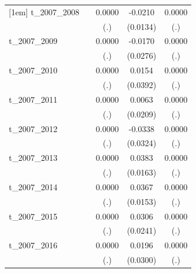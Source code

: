 \begin{table}[htbp]
\begin{tabular}{l*{4}{c}}
[1em]
t\_2007\_2008 &                     &      0.0000         &     -0.0210         &      0.0000         \\
            &                     &         (.)         &    (0.0134)         &         (.)         \\
[1em]
t\_2007\_2009 &                     &      0.0000         &     -0.0170         &      0.0000         \\
            &                     &         (.)         &    (0.0276)         &         (.)         \\
[1em]
t\_2007\_2010 &                     &      0.0000         &      0.0154         &      0.0000         \\
            &                     &         (.)         &    (0.0392)         &         (.)         \\
[1em]
t\_2007\_2011 &                     &      0.0000         &      0.0063         &      0.0000         \\
            &                     &         (.)         &    (0.0209)         &         (.)         \\
[1em]
t\_2007\_2012 &                     &      0.0000         &     -0.0338         &      0.0000         \\
            &                     &         (.)         &    (0.0324)         &         (.)         \\
[1em]
t\_2007\_2013 &                     &      0.0000         &      0.0383\sym{**} &      0.0000         \\
            &                     &         (.)         &    (0.0163)         &         (.)         \\
[1em]
t\_2007\_2014 &                     &      0.0000         &      0.0367\sym{**} &      0.0000         \\
            &                     &         (.)         &    (0.0153)         &         (.)         \\
[1em]
t\_2007\_2015 &                     &      0.0000         &      0.0306         &      0.0000         \\
            &                     &         (.)         &    (0.0241)         &         (.)         \\
[1em]
t\_2007\_2016 &                     &      0.0000         &      0.0196         &      0.0000         \\
            &                     &         (.)         &    (0.0300)         &         (.)         \\

\end{tabular}
\end{table}
